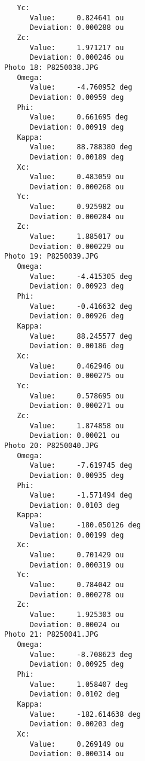 \documentclass{article}
\begin{document}
\begin{verbatim}
               Yc:
                  Value:     0.824641 ou
                  Deviation: 0.000288 ou
               Zc:
                  Value:     1.971217 ou
                  Deviation: 0.000246 ou
            Photo 18: P8250038.JPG
               Omega:
                  Value:     -4.760952 deg
                  Deviation: 0.00959 deg
               Phi:
                  Value:     0.661695 deg
                  Deviation: 0.00919 deg
               Kappa:
                  Value:     88.788380 deg
                  Deviation: 0.00189 deg
               Xc:
                  Value:     0.483059 ou
                  Deviation: 0.000268 ou
               Yc:
                  Value:     0.925982 ou
                  Deviation: 0.000284 ou
               Zc:
                  Value:     1.885017 ou
                  Deviation: 0.000229 ou
            Photo 19: P8250039.JPG
               Omega:
                  Value:     -4.415305 deg
                  Deviation: 0.00923 deg
               Phi:
                  Value:     -0.416632 deg
                  Deviation: 0.00926 deg
               Kappa:
                  Value:     88.245577 deg
                  Deviation: 0.00186 deg
               Xc:
                  Value:     0.462946 ou
                  Deviation: 0.000275 ou
               Yc:
                  Value:     0.578695 ou
                  Deviation: 0.000271 ou
               Zc:
                  Value:     1.874858 ou
                  Deviation: 0.00021 ou
            Photo 20: P8250040.JPG
               Omega:
                  Value:     -7.619745 deg
                  Deviation: 0.00935 deg
               Phi:
                  Value:     -1.571494 deg
                  Deviation: 0.0103 deg
               Kappa:
                  Value:     -180.050126 deg
                  Deviation: 0.00199 deg
               Xc:
                  Value:     0.701429 ou
                  Deviation: 0.000319 ou
               Yc:
                  Value:     0.784042 ou
                  Deviation: 0.000278 ou
               Zc:
                  Value:     1.925303 ou
                  Deviation: 0.00024 ou
            Photo 21: P8250041.JPG
               Omega:
                  Value:     -8.708623 deg
                  Deviation: 0.00925 deg
               Phi:
                  Value:     1.058407 deg
                  Deviation: 0.0102 deg
               Kappa:
                  Value:     -182.614638 deg
                  Deviation: 0.00203 deg
               Xc:
                  Value:     0.269149 ou
                  Deviation: 0.000314 ou

\end{verbatim}
\end{document}
